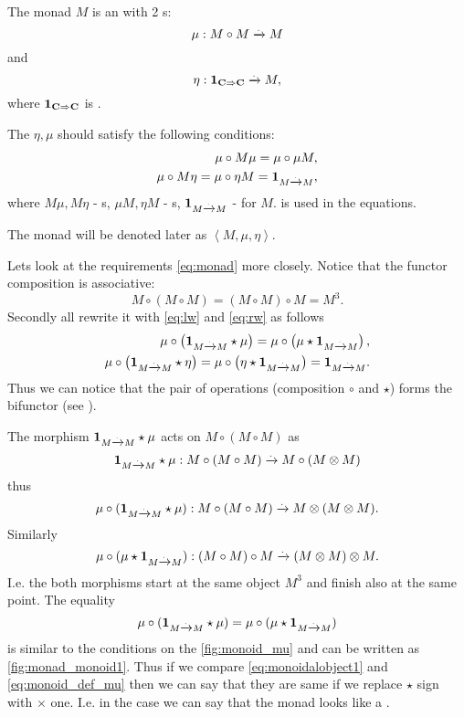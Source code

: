 \begin{definition}[Monad]
  \label{def:monad}
  The monad $M$ is an  with 2
  s:
  \begin{equation}
    \label{eq:monad_mu}
    \mu: M \circ M \xrightarrow{.} M
  \end{equation}
  and
  \begin{equation}
    \label{eq:monad_eta}
    \eta: \mathbf{1}_{ \mathbf{C} \Rightarrow \mathbf{C} } \xrightarrow{.} M,
  \end{equation}
  where $\mathbf{1}_{ \mathbf{C} \Rightarrow \mathbf{C} }$ is .

  The $\eta, \mu$ should satisfy the following conditions:
  \begin{eqnarray}
    \mu \circ M \mu = \mu \circ \mu M, 
    \nonumber \\
    \mu \circ M \eta = \mu \circ \eta M = \mathbf{1}_{ M \xrightarrow{.} M },
    \label{eq:monad}
  \end{eqnarray}
  where $M \mu, M \eta$ - s, $\mu M, \eta M$ -
  s, $\mathbf{1}_{ M \xrightarrow{.} M }$ -  for $M$.
   is used in the equations.

  The monad will be denoted later as $\left<M, \mu, \eta\right>$.
\end{definition}

Lets look at the requirements \eqref{eq:monad} more closely. Notice
that the functor composition is associative:
\[
M \circ ( M \circ M ) = (M \circ M) \circ M = M^3.
\]
Secondly 
all rewrite it with \eqref{eq:lw} and \eqref{eq:rw} as follows
\begin{eqnarray}
  \mu \circ \left( \mathbf{1}_{ M \xrightarrow{.} M } \star \mu \right) = 
  \mu \circ \left( \mu \star \mathbf{1}_{ M \xrightarrow{.} M } \right), 
  \nonumber \\
  \mu \circ \left( \mathbf{1}_{ M \xrightarrow{.} M } \star \eta \right) = 
  \mu \circ \left( \eta \star \mathbf{1}_{ M \xrightarrow{.} M } \right) = \mathbf{1}_{ M \xrightarrow{.} M }.
  \label{eq:monad_p1}
\end{eqnarray}
Thus we can notice that the pair of operations (composition $\circ$
and  $\star$) forms the bifunctor (see
). 

The morphism $\mathbf{1}_{ M \xrightarrow{.} M } \star \mu$ acts on $M \circ ( M \circ M )$ as
\[
\mathbf{1}_{ M \xrightarrow{.} M } \star \mu : M \circ ( M \circ M ) \xrightarrow{.} M \circ (M \otimes M)
\]
thus
\[
\mu \circ (\mathbf{1}_{ M \xrightarrow{.} M } \star \mu) : M \circ ( M \circ M ) \xrightarrow{.} M \otimes (M \otimes M).
\]
Similarly 
\[
\mu \circ (\mu \star \mathbf{1}_{ M \xrightarrow{.} M }) : (M \circ  M) \circ M  \xrightarrow{.} ( M \otimes M) \otimes M.
\]
I.e. the both morphisms start at the same object $M^3$ and finish also
at the same point. The equality 
\begin{equation}
\mu \circ (\mathbf{1}_{ M \xrightarrow{.} M } \star \mu) = 
\mu \circ (\mu \star \mathbf{1}_{ M \xrightarrow{.} M })
\label{eq:monoidalobject1}
\end{equation}
is similar to the conditions on the \cref{fig:monoid_mu} and can be
written as \cref{fig:monad_monoid1}. Thus if we compare
\eqref{eq:monoidalobject1} and \eqref{eq:monoid_def_mu} then we can say
that they are same if we replace $\star$ sign with $\times$ one. I.e.
in the case we can say that the monad looks like a
. 

